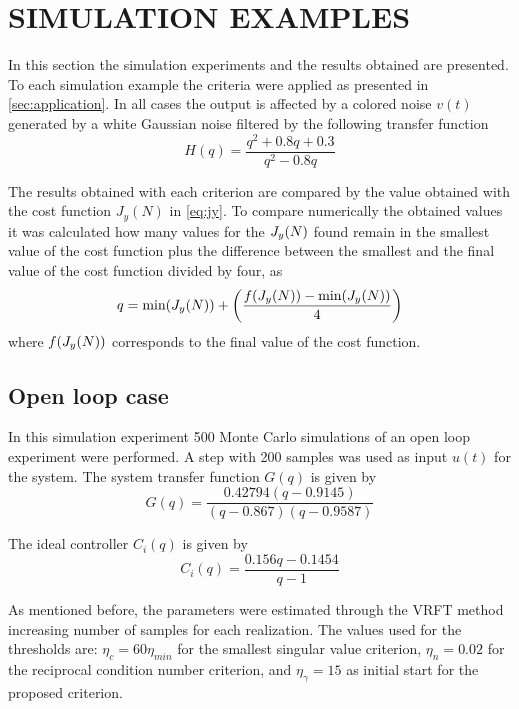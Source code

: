 \section{\label{sec:experiments} SIMULATION EXAMPLES}

In this section the simulation experiments and the results obtained are presented.
To each simulation example the criteria were applied as presented in \autoref{sec:application}.
In all cases the output is affected by a colored noise $v(t)$ generated by a white Gaussian noise filtered by the following transfer function
\begin{equation*}
	H(q) = \frac{q^2 + 0.8q + 0.3}{q^2 - 0.8q}
\end{equation*}

The results obtained with each criterion are compared by the value obtained with the cost function $J_y(N)$ in \eqref{eq:jy}.
To compare numerically the obtained values it was calculated how many values for the $J_y(N)$ found remain in the smallest value of the cost function plus the difference between the smallest and the final value of the cost function divided by four, as
\begin{equation}
	q = \text{min}(J_y(N)) + \left( \frac{f(J_y(N)) - \text{min}(J_y(N))}{4} \right)
\label{eq:threshold_jy}
\end{equation}
where $f(J_y(N))$ corresponds to the final value of the cost function.

\subsection{Open loop case}

In this simulation experiment 500 Monte Carlo simulations of an open loop experiment were performed.
A step with 200 samples was used as input $u(t)$ for the system.
The system transfer function $G(q)$ is given by
\begin{equation}
	G(q) = \frac{0.42794 (q-0.9145)}{(q-0.867) (q-0.9587)}
\label{eq:tf_system}
\end{equation}

The ideal controller $C_i(q)$ is given by
\begin{equation}
	C_i(q) = \frac{0.156q - 0.1454}{q-1}
\label{eq:tf_ci}
\end{equation}


As mentioned before, the parameters were estimated through the VRFT method increasing number of samples for each realization.
The values used for the thresholds are: $\eta_c = 60\eta_{min} $ for the smallest singular value criterion, $\eta_n = 0.02$ for the reciprocal condition number criterion, and $\eta_\gamma = 15$ as initial start for the proposed criterion.


